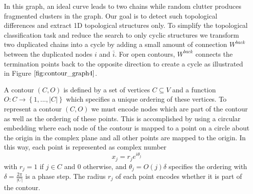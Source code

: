 \documentclass{SMBV13}
\begin{document}
In this graph, an ideal curve leads to two chains while random clutter produces fragmented clusters in the graph. Our goal is to detect such topological differences and extract 1D topological structures only. To simplify the topological classification task and reduce the search to only cyclic structures we transform two duplicated chains into a cycle by adding a small amount of connection $W^{back}$ between the duplicated nodes $i$ and $\bar{i}$. For open contours, $W^{back}$ connects the termination points back to the opposite direction to create a cycle as illustrated in Figure $\ref{fig:contour_graph4}$.

A contour $(C, O)$ is defined by a set of vertices $C \subseteq V$ and a function $O: C \rightarrow \left\lbrace 1, ..., \lvert C \rvert \right\rbrace$ which specifies a unique ordering of these vertices. To represent a contour $(C, O)$ we must encode nodes which are part of the contour as well as the ordering
of these points. This is accomplished by using a circular embedding where each node of the contour is mapped to a point on a circle about the origin in the complex plane and all other points are mapped to the origin. In this way, each point is represented as complex number
\begin{equation}
x_j = r_j e^{i \theta_j}
\end{equation}
with $r_j = 1$ if $j \in C$ and $0$ otherwise, and $\theta_j = O(j) \delta$ specifies the ordering with $\delta = \frac{2\pi}{\lvert C \rvert}$ is a phase step. The radius $r_j$ of each point encodes whether it is part of the contour.
\end{document}
